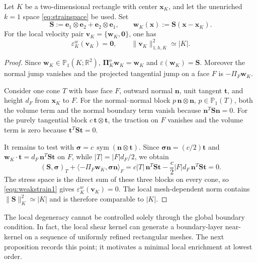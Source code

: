 \documentclass[review,hidelinks,onefignum,onetabnum]{siamart251216}
\newcommand{\sym}{\operatorname{sym}}
\begin{document}
\begin{lemma}\label{lem:k1-local-shear}
Let $K$ be a two-dimensional rectangle with center $\boldsymbol x_K$, and
let the unenriched $k=1$ space \eqref{eq:strainspace} be used.  Set
\[
 \boldsymbol S:=\boldsymbol e_1\otimes\boldsymbol e_2+
 \boldsymbol e_2\otimes\boldsymbol e_1,
 \qquad
 \boldsymbol w_K(\boldsymbol x):=
 \boldsymbol S(\boldsymbol x-\boldsymbol x_K).
\]
For the local velocity pair
$\boldsymbol v_K=\{\boldsymbol w_K,\boldsymbol0\}$, one has
\[
 \varepsilon_K^w(\boldsymbol v_K)=\boldsymbol0,
 \qquad
 \|\boldsymbol v_K\|_{1,h,K}^2\simeq |K|.
\]
\end{lemma}
\begin{proof}
Since $\boldsymbol w_K\in\mathbb P_1(K;\mathbb R^2)$,
$\boldsymbol\Pi_K^o\boldsymbol w_K=\boldsymbol w_K$ and
$\varepsilon(\boldsymbol w_K)=\boldsymbol S$.  Moreover the normal jump
vanishes and the projected tangential jump on a face $F$ is
$-\Pi_F\boldsymbol w_K$.

Consider one cone $T$ with base face $F$, outward normal
$\boldsymbol n$, unit tangent $\boldsymbol t$, and height $d_F$ from
$\boldsymbol x_K$ to $F$.  For the normal--normal block
$p\,\boldsymbol n\otimes\boldsymbol n$, $p\in\mathbb P_1(T)$, both the
volume term and the normal boundary term vanish because
$\boldsymbol n^T\boldsymbol S\boldsymbol n=0$.  For the purely tangential
block $c\,\boldsymbol t\otimes\boldsymbol t$, the traction on $F$ vanishes
and the volume term is zero because
$\boldsymbol t^T\boldsymbol S\boldsymbol t=0$.

It remains to test with
$\boldsymbol\sigma=c\,\sym(\boldsymbol n\otimes\boldsymbol t)$.  Since
$\boldsymbol\sigma\boldsymbol n=(c/2)\boldsymbol t$ and
$\boldsymbol w_K\cdot\boldsymbol t
=d_F\,\boldsymbol n^T\boldsymbol S\boldsymbol t$ on $F$, while
$|T|=|F|d_F/2$, we obtain
\[
 (\boldsymbol S,\boldsymbol\sigma)_T
 +\langle-\Pi_F\boldsymbol w_K,
   \boldsymbol\sigma\boldsymbol n\rangle_F
 =c|T|\,\boldsymbol n^T\boldsymbol S\boldsymbol t
 -\frac c2|F|d_F\,\boldsymbol n^T\boldsymbol S\boldsymbol t=0.
\]
The stress space is the direct sum of these three blocks on every cone, so
\eqref{equ:weakstrain1} gives
$\varepsilon_K^w(\boldsymbol v_K)=0$.  The local mesh-dependent norm contains
$\|\boldsymbol S\|_K^2\simeq |K|$ and is therefore comparable to $|K|$.
\end{proof}

The local degeneracy cannot be controlled solely through the global
boundary condition.  In fact, the local shear kernel can generate a boundary-layer
near-kernel on a sequence of uniformly refined rectangular meshes.  The next
proposition records this point; it motivates a minimal local enrichment at lowest
order.
\end{document}
